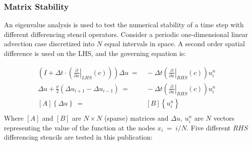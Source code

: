 \documentclass[conf]{new-aiaa}
\begin{document}
\subsubsection{Matrix Stability}
An eigenvalue analysis is used to test the numerical stability of a time step with different differencing stencil operators. 
Consider a periodic one-dimensional linear advection case discretized into $N$ equal intervals in space. 
A second order spatial difference is used on the LHS, and the governing equation is:

\begin{equation}
	\begin{split}
		\label{eq:LAE}
  			\left(I+\Delta{t}\cdot\left(\left.\frac{\partial}{\partial{x}}\right|_{LHS}\left(c\right)\right)\right)\Delta{u}~=&~-\Delta{t}\left(\left.\frac{\partial}{\partial{x}}\right|_{RHS}\left(c\right)\right) {u}_i^{n} \\
  			\Delta{u}+\frac{\nu}{2}\left(\Delta{u_{i+1}}-\Delta{u_{i-1}} \right)~=&~-\Delta{t}\left(\left.\frac{\partial}{\partial{x}}\right|_{RHS}\left(c\right)\right) {u}_i^{n} \\
  			\left[A\right]\left\{\Delta{u}\right\}~=&~\left[B\right]\left\{u_{i}^{n}\right\} \\
	\end{split}
\end{equation}
Where $[A]$ and $[B]$ are $N\times{N}$ (sparse) matrices and $\Delta{u},~u_{i}^{n}$ are $N$ vectors representing the value of the function at the nodes $x_i~=~i/N$.
Five different $RHS$ differencing stencils are tested in this publication:
\end{document}
